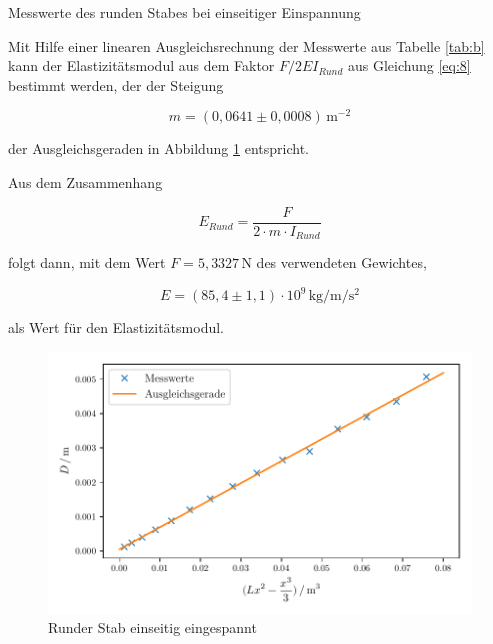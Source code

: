\begin{table}[H]
  \centering
  
  
  \caption{Messwerte des runden Stabes bei einseitiger Einspannung}
  \label{tab:b}
\end{table}

Mit Hilfe einer linearen Ausgleichsrechnung der Messwerte
aus Tabelle \ref{tab:b} kann der Elastizitätsmodul aus dem 
Faktor $F/2EI_{Rund}$ aus Gleichung \ref{eq:8} bestimmt werden, der der Steigung 

\begin{equation*}
  m=(0,0641 \pm 0,0008)\,\si{\meter\tothe{-2}}
\end{equation*}

\noindent der Ausgleichsgeraden
in Abbildung \ref{fig:a} entspricht.

Aus dem Zusammenhang 

\begin{equation}
  E_{Rund}=\frac{F}{2 \cdot m \cdot I_{Rund}}
\end{equation}

\noindent folgt dann, mit dem Wert $F=5,3327\,\si{\newton}$ des verwendeten Gewichtes,

\begin{equation*}
  E=(85,4 \pm 1,1) \cdot 10^{9} \,\si{\kilo\gram\per\meter\per\second\squared}
\end{equation*}

\noindent als Wert für den Elastizitätsmodul.


\begin{figure}[H]
  \centering
  \includegraphics{build/plot1.pdf}
  \caption{Runder Stab einseitig eingespannt}
  \label{fig:a}
\end{figure}



